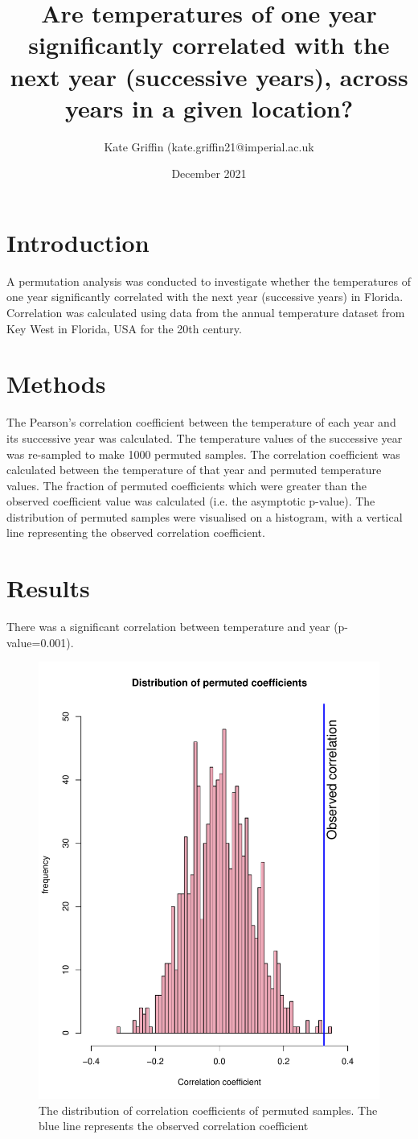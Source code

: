 \documentclass{article}
\title{Are temperatures of one year significantly correlated with the next year (successive years), across years in a given location?}
\author{Kate Griffin (kate.griffin21@imperial.ac.uk}
\date{December 2021}
\begin{document}
	
	\maketitle
	
	\section{Introduction}
	A permutation analysis was conducted to investigate whether the temperatures of one year significantly correlated with the next year (successive years) in Florida. Correlation was calculated using data from the annual temperature dataset from Key West in Florida, USA for the 20th century. 
	
	\section{Methods}
	The Pearson's correlation coefficient between the temperature of each year and its successive year was calculated. The temperature values of the successive year was re-sampled to make 1000 permuted samples. The correlation coefficient was calculated between the temperature of that year and permuted temperature values. The fraction of permuted coefficients which were greater than the observed coefficient value was calculated (i.e. the asymptotic p-value). The distribution of permuted samples were visualised on a histogram, with a vertical line representing the observed correlation coefficient. 
	
	\section{Results} 
	There was a significant correlation between temperature and year (p-value=0.001). 
	\begin{figure}[H]
		\includegraphics[width= 50 mm, scale=0.31]{../results/TAutoCorr_hist.pdf}
		\caption{The distribution of correlation coefficients of permuted samples. The blue line represents the observed correlation coefficient}
		\label{The distribution of correlation coefficients of permuted samples. The blue line represents the observed correlation coefficient}
	\end{figure}
	
\end{document}
